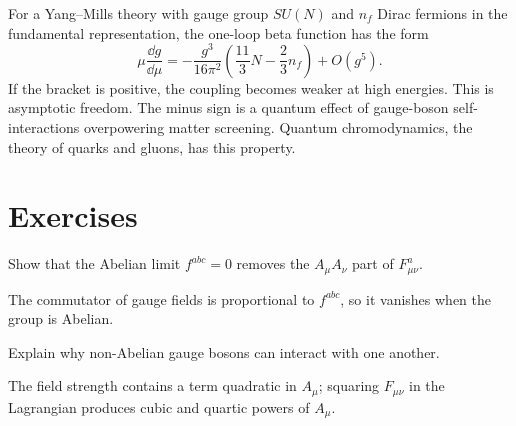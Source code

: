 For a Yang--Mills theory with gauge group \(SU(N)\) and \(n_f\) Dirac fermions in the fundamental representation, the one-loop beta function has the form
\[
  \mu\frac{\dd g}{\dd\mu}
  =
  -\frac{g^3}{16\pi^2}
  \left(\frac{11}{3}N-\frac{2}{3}n_f\right)+O(g^5).
\]
If the bracket is positive, the coupling becomes weaker at high energies.  This is asymptotic freedom.  The minus sign is a quantum effect of gauge-boson self-interactions overpowering matter screening.  Quantum chromodynamics, the theory of quarks and gluons, has this property.

\section*{Exercises}

\begin{exercise}
Show that the Abelian limit \(f^{abc}=0\) removes the \(A_\mu A_\nu\) part of \(F_{\mu\nu}^a\).
\begin{answer}
The commutator of gauge fields is proportional to \(f^{abc}\), so it vanishes when the group is Abelian.
\end{answer}
\end{exercise}

\begin{exercise}
Explain why non-Abelian gauge bosons can interact with one another.
\begin{answer}
The field strength contains a term quadratic in \(A_\mu\); squaring \(F_{\mu\nu}\) in the Lagrangian produces cubic and quartic powers of \(A_\mu\).
\end{answer}
\end{exercise}
